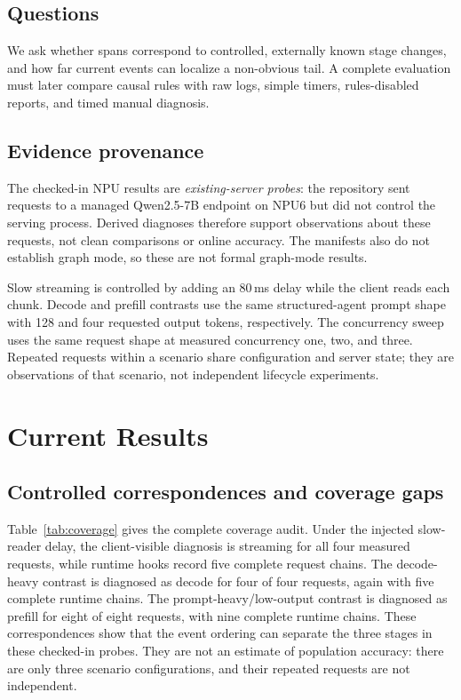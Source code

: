 \documentclass[sigconf,screen,nonacm]{acmart}
\begin{document}
\subsection{Questions}

We ask whether spans correspond to controlled, externally known stage changes,
and how far current events can localize a non-obvious tail. A complete
evaluation must later compare causal rules with raw logs, simple timers,
rules-disabled reports, and timed manual diagnosis.

\subsection{Evidence provenance}

The checked-in NPU results are \emph{existing-server probes}: the repository
sent requests to a managed Qwen2.5-7B endpoint on NPU6 but did not control the
serving process. Derived diagnoses therefore support observations about these
requests, not clean comparisons or online accuracy. The manifests also do not
establish graph mode, so these are not formal graph-mode results.

Slow streaming is controlled by adding an 80\,ms delay while the client reads
each chunk. Decode and prefill contrasts use the same structured-agent prompt
shape with 128 and four requested output tokens, respectively. The concurrency
sweep uses the same request shape at measured concurrency one, two, and three.
Repeated requests within a scenario share configuration and server state; they
are observations of that scenario, not independent lifecycle experiments.

\section{Current Results}
\label{sec:evaluation}

\subsection{Controlled correspondences and coverage gaps}

Table~\ref{tab:coverage} gives the complete coverage audit. Under the injected
slow-reader delay, the client-visible diagnosis is streaming for all four
measured requests, while runtime hooks record five complete request chains.
The decode-heavy contrast is diagnosed as decode for four of four requests,
again with five complete runtime chains. The prompt-heavy/low-output contrast
is diagnosed as prefill for eight of eight requests, with nine complete runtime
chains. These correspondences show that the event ordering can separate the
three stages in these checked-in probes. They are not an estimate of population
accuracy: there are only three scenario configurations, and their repeated
requests are not independent.
\end{document}
